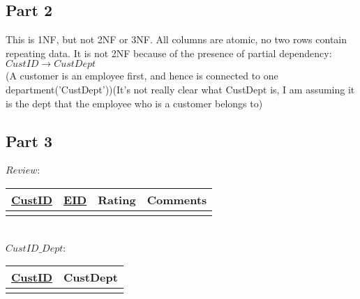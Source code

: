 \documentclass[a4paper,11pt,x11names]{article}
\begin{document}
	
	
	
\subsection{Part 2}
This is 1NF, but not 2NF or 3NF. All columns are atomic, no two rows contain repeating data. It is not 2NF because of the presence of partial dependency:
	$CustID \longrightarrow CustDept$\\(A customer is an employee first, and hence is connected to one department('CustDept'))(It's not really clear what CustDept is, I am assuming it is the dept that the employee who is a customer belongs to)	
	
\subsection{Part 3}
    $Review$:
	\begin{tabular}{|c|c|c|c|}
	\hline \underline{CustID} & \underline{EID}  &  Rating & Comments  \\ 
	\hline  &  &  &   \\ 
	\hline 
	\end{tabular} \\
	$CustID\_Dept$:
	\begin{tabular}{|c|c|}
		\hline \underline{CustID}  & {CustDept}   \\ 
		\hline  &    \\ 
		\hline 
	\end{tabular} 
	\newline	
\end{document}
